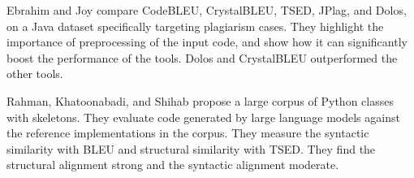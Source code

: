 Ebrahim and Joy \cite{ebrahim26} compare CodeBLEU, CrystalBLEU, TSED, JPlag, and Dolos, on a Java dataset specifically targeting plagiarism cases.
They highlight the importance of preprocessing of the input code, and show how it can significantly boost the performance of the tools.
Dolos and CrystalBLEU outperformed the other tools.

Rahman, Khatoonabadi, and Shihab \cite{rahman26} propose a large corpus of Python classes with skeletons.
They evaluate code generated by large language models against the reference implementations in the corpus.
They measure the syntactic similarity with BLEU and structural similarity with TSED.
They find the structural alignment strong and the syntactic alignment moderate.

